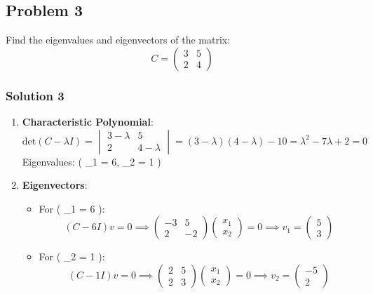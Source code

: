 \documentclass[
  letterpaper,
  DIV=11,
  numbers=noendperiod]{scrartcl}
\providecommand{\tightlist}{%
  \setlength{\itemsep}{0pt}\setlength{\parskip}{0pt}}\usepackage{longtable,booktabs,array}
\begin{document}
\subsection{Problem 3}\label{problem-3}

Find the eigenvalues and eigenvectors of the matrix: \[
C = \begin{pmatrix} 3 & 5 \\ 2 & 4 \end{pmatrix}
\]

\subsubsection{Solution 3}\label{solution-3}

\begin{enumerate}
\def\labelenumi{\arabic{enumi}.}
\item
  \textbf{Characteristic Polynomial}: \[
  \text{det}(C - \lambda I) = \begin{vmatrix} 3 - \lambda & 5 \\ 2 & 4 - \lambda \end{vmatrix} = (3 - \lambda)(4 - \lambda) - 10 = \lambda^2 - 7\lambda + 2 = 0
  \] Eigenvalues: ( \lambda\_1 = 6, \lambda\_2 = 1 )
\item
  \textbf{Eigenvectors}:

  \begin{itemize}
  \tightlist
  \item
    For ( \lambda\_1 = 6 ): \[
    (C - 6I)v = 0 \implies \begin{pmatrix} -3 & 5 \\ 2 & -2 \end{pmatrix}\begin{pmatrix} x_1 \\ x_2 \end{pmatrix} = 0 \implies v_1 = \begin{pmatrix} 5 \\ 3 \end{pmatrix}
    \]
  \item
    For ( \lambda\_2 = 1 ): \[
    (C - 1I)v = 0 \implies \begin{pmatrix} 2 & 5 \\ 2 & 3 \end{pmatrix}\begin{pmatrix} x_1 \\ x_2 \end{pmatrix} = 0 \implies v_2 = \begin{pmatrix} -5 \\ 2 \end{pmatrix}
    \]
  \end{itemize}
\end{enumerate}
\end{document}
